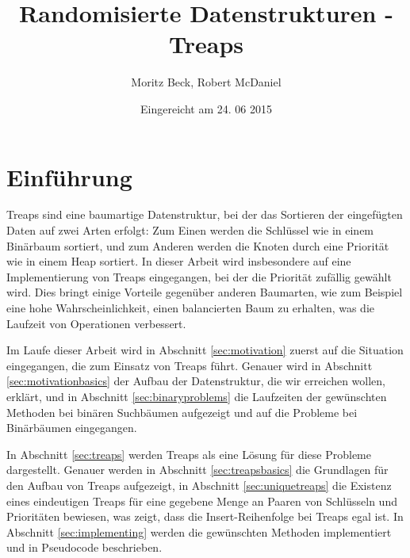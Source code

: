 \documentclass[a4paper]{scrreprt}
\theoremstyle{definition}
\begin{document}

\subject{Seminararbeit}
\title{Randomisierte Datenstrukturen - Treaps}
\author{Moritz Beck, Robert McDaniel}
\date{Eingereicht am 24. 06 2015} %
\titlehead{Julius-Maximilians-Universität Würzburg\\
Institut für Informatik\\
Lehrstuhl für Informatik I\\
Effiziente Algorithmen und wissensbasierte Systeme}
\publishers{Betreuer:\\
Prof.\ Dr.\ Alexander Wolff\\
Dr.\ Philipp Kindermann}
\maketitle
\tableofcontents


\chapter{Einführung}
\label{sec:intro}

Treaps sind eine baumartige Datenstruktur, bei der das Sortieren der eingefügten Daten auf zwei Arten erfolgt:
Zum Einen werden die Schlüssel wie in einem Binärbaum sortiert, und zum Anderen werden die Knoten durch eine Priorität wie in einem Heap sortiert.
In dieser Arbeit wird insbesondere auf eine Implementierung von Treaps eingegangen, bei der die Priorität zufällig gewählt wird.
Dies bringt einige Vorteile gegenüber anderen Baumarten, wie zum Beispiel eine hohe Wahrscheinlichkeit, einen balancierten Baum zu erhalten, was die Laufzeit von Operationen verbessert.

Im Laufe dieser Arbeit wird in Abschnitt \ref{sec:motivation} zuerst auf die Situation eingegangen, die zum Einsatz von Treaps führt.
Genauer wird in Abschnitt \ref{sec:motivationbasics} der Aufbau der Datenstruktur, die wir erreichen wollen, erklärt, und in Abschnitt \ref{sec:binaryproblems} die Laufzeiten der gewünschten Methoden bei binären Suchbäumen aufgezeigt und auf die Probleme bei Binärbäumen eingegangen.

In Abschnitt \ref{sec:treaps} werden Treaps als eine Lösung für diese Probleme dargestellt.
Genauer werden in Abschnitt \ref{sec:treapsbasics} die Grundlagen für den Aufbau von Treaps aufgezeigt, in Abschnitt \ref{sec:uniquetreaps} die Existenz eines eindeutigen Treaps für eine gegebene Menge an Paaren von Schlüsseln und Prioritäten bewiesen, was zeigt, dass die Insert-Reihenfolge bei Treaps egal ist. In Abschnitt \ref{sec:implementing} werden die gewünschten Methoden implementiert und in Pseudocode beschrieben.
\end{document}
